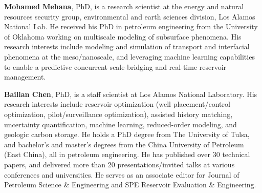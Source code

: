 \documentclass[a4paper,fleqn]{cas-sc}
\begin{document}
\bio{}
{\bf Mohamed Mehana}, PhD, is a research scientist at the energy and natural resources security group, environmental and earth sciences division, Los Alamos National Lab. He received his PhD in petroleum engineering from the University of Oklahoma working on multiscale modeling of subsurface phenomena. His research interests include modeling and simulation of transport and interfacial phenomena at the meso/nanoscale, and leveraging machine learning capabilities to enable a predictive concurrent scale-bridging and real-time reservoir management.
\endbio


\bio{}
{\bf Bailian Chen}, PhD, is a staff scientist at Los Alamos National Laboratory. His research interests include reservoir optimization (well placement/control optimization, pilot/surveillance optimization), assisted history matching, uncertainty quantification, machine learning, reduced-order modeling, and geologic carbon storage. He holds a PhD degree from The University of Tulsa, and bachelor’s and master’s degrees from the China University of Petroleum (East China), all in petroleum engineering. He has published over 30 technical papers, and delivered more than 20 presentations/invited talks at various conferences and universities. He serves as an associate editor for Journal of Petroleum Science \& Engineering and SPE Reservoir Evaluation \& Engineering.
\endbio
\end{document}

